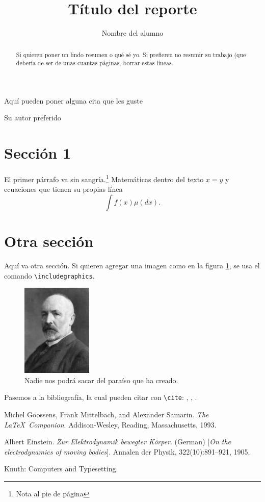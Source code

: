 \documentclass[
letterpaper,
11pt,
oneside,
onecolumn, %
article
]{memoir}
\title{Título del reporte} %
\author{Nombre del alumno} %
\begin{document}
\thispagestyle{empty}
\maketitle

\begin{abstract}
    Si quieren poner un lindo resumen o qué sé yo. Si prefieren no resumir su trabajo (que debería de ser de unas cuantas páginas, borrar estas líneas.
\end{abstract}

\epigraph{Aquí pueden poner alguna cita que les guste}{Su autor preferido}

\section*{Sección 1}

\noindent El primer párrafo va sin sangría.\footnote{Nota al pie de página} Matemáticas dentro del texto $x = y$ y ecuaciones que tienen su propias línea \[\int f (x) \mu(d x).\] 

\lipsum[1-6]

\section*{Otra sección}

\noindent Aquí va otra sección. Si quieren agregar una imagen como en la figura \ref{Figura}, se usa el comando \texttt{\textbackslash{}includegraphics}.

\begin{figure}[ht]
    \centering
    \includegraphics[width=0.3\textwidth,keepaspectratio]{Cantor}
    \caption{Nadie nos podrá sacar del paraíso que ha creado.}
    \label{Figura}
\end{figure}

Pasemos a la bibliografía, la cual pueden citar con \texttt{\textbackslash{}cite}: \cite{latexcompanion}, \cite{einstein}, \cite{knuthwebsite}.

\begin{thebibliography}{9}
Michel Goossens, Frank Mittelbach, and Alexander Samarin. 
\textit{The \LaTeX\ Companion}. 
Addison-Wesley, Reading, Massachusetts, 1993.
 
Albert Einstein. 
\textit{Zur Elektrodynamik bewegter K{\"o}rper}. (German) 
[\textit{On the electrodynamics of moving bodies}]. 
Annalen der Physik, 322(10):891–921, 1905.
 
Knuth: Computers and Typesetting.
\end{thebibliography}
\end{document}
